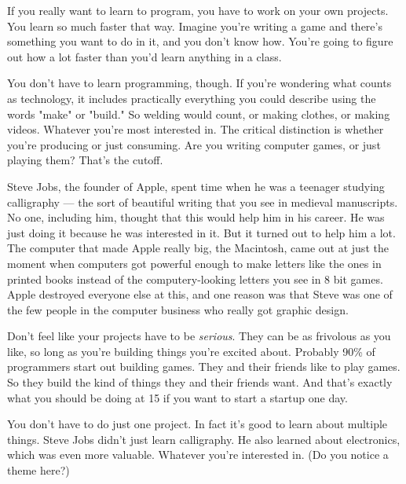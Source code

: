 If you really want to learn to
                  program, you have to work on your own projects. You learn so
                  much faster that way. Imagine you're writing a game and
                  there's something you want to do in it, and you don't know
                  how. You're going to figure out how a lot faster than you'd
                  learn anything in a class.

You don't have to learn
                  programming, though. If you're wondering what counts as
                  technology, it includes practically everything you could
                  describe using the words "make" or "build." So welding would
                  count, or making clothes, or making videos. Whatever you're
                  most interested in. The critical distinction is whether you're
                  producing or just consuming. Are you writing computer games,
                  or just playing them? That's the cutoff.

Steve
                  Jobs, the founder of Apple, spent time when he was a teenager
                  studying calligraphy --- the sort of beautiful writing
                  that you see in medieval manuscripts. No one, including him,
                  thought that this would help him in his career. He was just
                  doing it because he was interested in it. But it turned out to
                  help him a lot. The computer that made Apple really big, the
                  Macintosh, came out at just the moment when computers got
                  powerful enough to make letters like the ones in printed books
                  instead of the computery-looking letters you see in 8 bit
                  games. Apple destroyed everyone else at this, and one reason
                  was that Steve was one of the few people in the computer
                  business who really got graphic design.

Don't feel
                  like your projects have to be \emph{serious}. They can be as
                  frivolous as you like, so long as you're building things
                  you're excited about. Probably 90\% of programmers start out
                  building games. They and their friends like to play games. So
                  they build the kind of things they and their friends want. And
                  that's exactly what you should be doing at 15 if you want to
                  start a startup one day.

You don't have to do just
                  one project. In fact it's good to learn about multiple things.
                  Steve Jobs didn't just learn calligraphy. He also learned
                  about electronics, which was even more valuable. Whatever
                  you're interested in. (Do you notice a theme here?)

